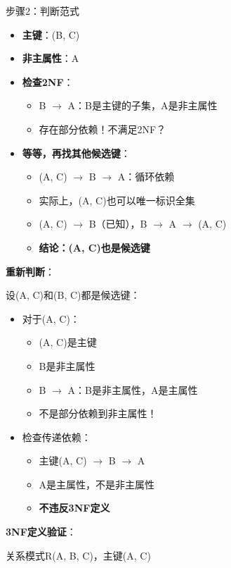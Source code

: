 \documentclass[12pt, a4paper]{article}
\newenvironment{bluebox}[1]{%
  \begin{trivlist}
  \item[\hskip\labelsep \textbf{#1}]
  \setlength{\parskip}{0.5ex}
  \setlength{\itemsep}{0.5ex}
}{%
  \end{trivlist}
  }
\begin{document}
\begin{bluebox}{例题11：范式判定}
	步骤2：判断范式

	\begin{itemize}
		\item \textbf{主键}：(B, C)
		\item \textbf{非主属性}：A
		\item \textbf{检查2NF}：
		      \begin{itemize}[nosep]
			      \item B $\to$ A：B是主键的子集，A是非主属性
			      \item 存在部分依赖！不满足2NF？
		      \end{itemize}
		\item \textbf{等等，再找其他候选键}：
		      \begin{itemize}[nosep]
			      \item (A, C) $\to$ B $\to$ A：循环依赖
			      \item 实际上，(A, C)也可以唯一标识全集
			      \item (A, C) $\to$ B（已知），B $\to$ A $\to$ (A, C)
			      \item \textbf{结论：(A, C)也是候选键}
		      \end{itemize}
	\end{itemize}

	\textbf{重新判断}：

	设(A, C)和(B, C)都是候选键：

	\begin{itemize}
		\item 对于(A, C)：
		      \begin{itemize}[nosep]
			      \item (A, C)是主键
			      \item B是非主属性
			      \item B $\to$ A：B是非主属性，A是主属性
			      \item 不是部分依赖到非主属性！
		      \end{itemize}
		\item 检查传递依赖：
		      \begin{itemize}[nosep]
			      \item 主键(A, C) $\to$ B $\to$ A
			      \item A是主属性，不是非主属性
			      \item \textbf{不违反3NF定义}
		      \end{itemize}
	\end{itemize}

	\textbf{3NF定义验证}：

	关系模式R(A, B, C)，主键(A, C)


\end{bluebox}
\end{document}
